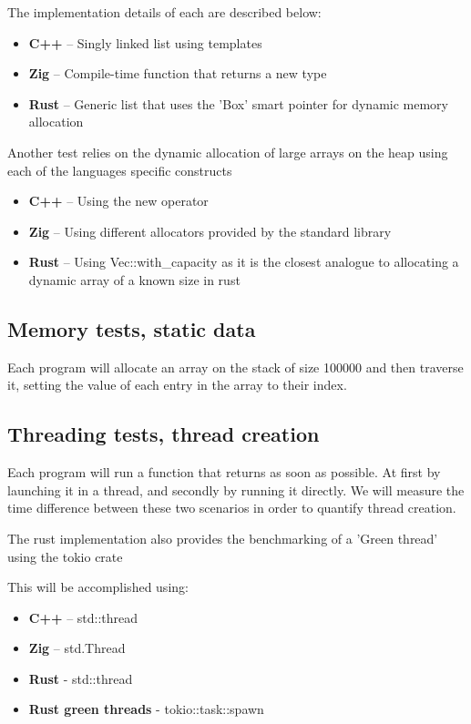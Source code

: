 \documentclass{article}
\begin{document}
The implementation details of each are described below:
\begin{itemize}
    \item \textbf{C++} – Singly linked list using templates
    \item \textbf{Zig} – Compile-time function that returns a new type
    \item \textbf{Rust} – Generic list that uses the 'Box' smart pointer for dynamic memory allocation
\end{itemize}

Another test relies on the dynamic allocation of large arrays on the heap using each of the languages specific constructs
\begin{itemize}
    \item \textbf{C++} – Using the new operator
    \item \textbf{Zig} – Using different allocators provided by the standard library
    \item \textbf{Rust} – Using Vec::with\_capacity as it is the closest analogue to allocating a dynamic array of a known size in rust
\end{itemize}

\subsection{Memory tests, static data}

Each program will allocate an array on the stack of size 100000 and then traverse it, setting the value of each entry in the array to their index.

\subsection{Threading tests, thread creation}

Each program will run a function that returns as soon as possible. At first by launching it in a thread, and secondly by running it directly.
We will measure the time difference between these two scenarios in order to quantify thread creation.

The rust implementation also provides the benchmarking of a 'Green thread' using the tokio crate

This will be accomplished using:
\begin{itemize}
    \item \textbf{C++} – std::thread
    \item \textbf{Zig} – std.Thread
    \item \textbf{Rust} - std::thread
    \item \textbf{Rust green threads} - tokio::task::spawn
\end{itemize}
\end{document}
